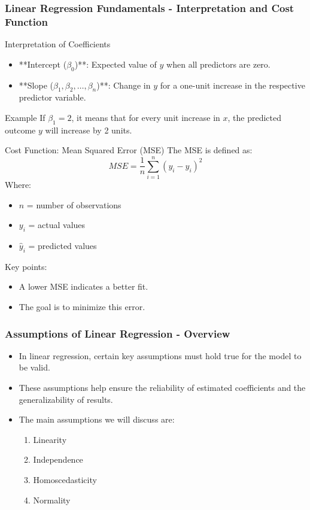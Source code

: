 \documentclass[aspectratio=169]{beamer}
\begin{document}
\begin{frame}[fragile]
  \frametitle{Linear Regression Fundamentals - Interpretation and Cost Function}
  \begin{block}{Interpretation of Coefficients}
    \begin{itemize}
      \item **Intercept (\( \beta_0 \))**: Expected value of \( y \) when all predictors are zero.
      \item **Slope (\( \beta_1, \beta_2, \ldots, \beta_n \))**: Change in \( y \) for a one-unit increase in the respective predictor variable.
    \end{itemize}
    \begin{exampleblock}{Example}
      If \( \beta_1 = 2 \), it means that for every unit increase in \( x \), the predicted outcome \( y \) will increase by 2 units.
    \end{exampleblock}
  \end{block}

  \begin{block}{Cost Function: Mean Squared Error (MSE)}
    The MSE is defined as:
    \begin{equation}
      MSE = \frac{1}{n} \sum_{i=1}^{n}(y_i - \hat{y}_i)^2 
    \end{equation}
    Where:
    \begin{itemize}
      \item \( n \) = number of observations
      \item \( y_i \) = actual values
      \item \( \hat{y}_i \) = predicted values
    \end{itemize}
    Key points:
    \begin{itemize}
      \item A lower MSE indicates a better fit.
      \item The goal is to minimize this error.
    \end{itemize}
  \end{block}
\end{frame}

\begin{frame}[fragile]
    \frametitle{Assumptions of Linear Regression - Overview}
    \begin{itemize}
        \item In linear regression, certain key assumptions must hold true for the model to be valid.
        \item These assumptions help ensure the reliability of estimated coefficients and the generalizability of results.
        \item The main assumptions we will discuss are:
        \begin{enumerate}
            \item Linearity
            \item Independence
            \item Homoscedasticity
            \item Normality
        \end{enumerate}
    \end{itemize}
\end{frame}
\end{document}
